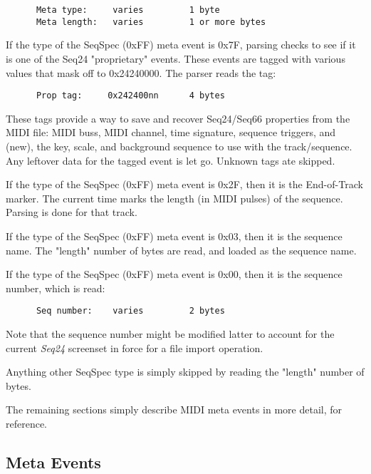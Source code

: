    \begin{verbatim}
      Meta type:     varies         1 byte
      Meta length:   varies         1 or more bytes
   \end{verbatim}

   If the type of the SeqSpec (0xFF) meta event is 0x7F, parsing checks to see
   if it is one of the Seq24 "proprietary" events.  These events are tagged
   with various values that mask off to 0x24240000.  The parser reads the
   tag:

   \begin{verbatim}
      Prop tag:     0x242400nn      4 bytes
   \end{verbatim}

   These tags provide a way to save and recover Seq24/Seq66 properties
   from the MIDI file: MIDI buss, MIDI channel, time signature, sequence
   triggers, and (new), the key, scale, and background sequence to use with the
   track/sequence.  Any leftover data for the tagged event is let go.  Unknown
   tags ate skipped.

   If the type of the SeqSpec (0xFF) meta event is 0x2F, then it is the
   End-of-Track marker.  The current time marks the length (in MIDI pulses) of
   the sequence.  Parsing is done for that track.

   If the type of the SeqSpec (0xFF) meta event is 0x03, then it is the
   sequence name.  The "length" number of bytes are read, and loaded as the
   sequence name.

   If the type of the SeqSpec (0xFF) meta event is 0x00, then it is the
   sequence number, which is read:

   \begin{verbatim}
      Seq number:    varies         2 bytes
   \end{verbatim}

   Note that the sequence number might be modified latter to account for the
   current \textsl{Seq24} screenset in force for a file import operation.

   Anything other SeqSpec type is simply skipped by reading the "length" number
   of bytes.

   The remaining sections simply describe MIDI meta events in more detail, for
   reference.

\subsection{Meta Events}
\label{subsubsec:midi_format_meta_events_summary}


